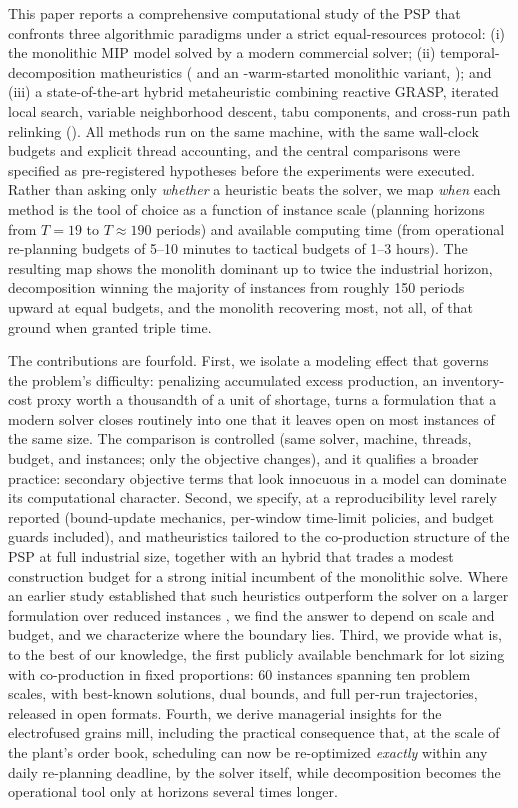 This paper reports a comprehensive computational study of the PSP that
confronts three algorithmic paradigms under a strict equal-resources
protocol: (i) the monolithic MIP model solved by a modern commercial
solver; (ii) temporal-decomposition matheuristics (\RFFO{} and an
\RF-warm-started monolithic variant, \RFMIP); and (iii) a
state-of-the-art hybrid metaheuristic combining reactive GRASP,
iterated local search, variable neighborhood descent, tabu components,
and cross-run path relinking (\ILS). All methods run on the same
machine, with the same wall-clock budgets and explicit thread
accounting, and the central comparisons were specified as
pre-registered hypotheses before the experiments were executed.
Rather than asking only \emph{whether} a heuristic beats the solver,
we map \emph{when} each method is the tool of choice as a function of
instance scale (planning horizons from $T\!=\!19$ to $T\!\approx\!190$
periods) and available computing time (from operational re-planning
budgets of 5--10 minutes to tactical budgets of 1--3 hours).
The resulting map shows the monolith dominant up to twice the
industrial horizon, decomposition winning the majority of instances
from roughly 150 periods upward at equal budgets, and the monolith
recovering most, not all, of that ground when granted triple
time.

The contributions are fourfold. First, we isolate a modeling effect
that governs the problem's difficulty: penalizing accumulated excess
production, an inventory-cost proxy worth a thousandth of a unit of
shortage, turns a formulation that a modern solver closes routinely
into one that it leaves open on most instances of the same size. The
comparison is controlled (same solver, machine, threads, budget, and
instances; only the objective changes), and it qualifies a broader
practice: secondary objective terms that look innocuous in a model can
dominate its computational character. Second, we specify, at a
reproducibility level rarely reported (bound-update mechanics,
per-window time-limit policies, and budget guards included), \RF{} and
\FO{} matheuristics tailored to the co-production structure of the PSP
at full industrial size, together with an \RFMIP{} hybrid that trades
a modest construction budget for a strong initial incumbent of the
monolithic solve. Where an earlier study established that such
heuristics outperform the solver on a larger formulation over reduced
instances \citep{villasboas2021modeling}, we find the answer to
depend on scale and budget, and we characterize where the boundary
lies. Third, we
provide what is, to the best of our knowledge, the first publicly
available benchmark for lot sizing with co-production in fixed
proportions: 60 instances spanning ten problem scales, with best-known
solutions, dual bounds, and full per-run trajectories, released in
open formats. Fourth, we derive managerial insights for the
electrofused grains mill, including the practical consequence that,
at the scale of the plant's order book, scheduling can now be
re-optimized \emph{exactly} within any daily re-planning deadline, by the solver itself, while decomposition becomes the operational
tool only at horizons several times longer.

